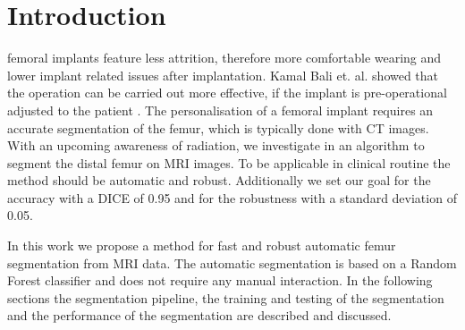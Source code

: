 \section{Introduction}
 femoral implants feature less attrition, therefore more comfortable wearing and lower implant related issues after implantation. Kamal Bali et. al. showed that the operation can be carried out more effective, if the implant is pre-operational adjusted to the patient \cite{Bali20121149}. The personalisation of a femoral implant requires an accurate segmentation of the femur, which is typically done with CT images. With an upcoming awareness of radiation, we investigate in an algorithm to segment the distal femur on MRI images. To be applicable in clinical routine the method should be automatic and robust. Additionally we set our goal for the accuracy with a DICE of 0.95 and for the robustness with a standard deviation of 0.05.

In this work we propose a method for fast and robust automatic femur segmentation from MRI data. The automatic segmentation is based on a Random Forest classifier \cite{rf} and does not require any manual interaction. In the following sections the segmentation pipeline, the training and testing of the segmentation and the performance of the segmentation are described and discussed.